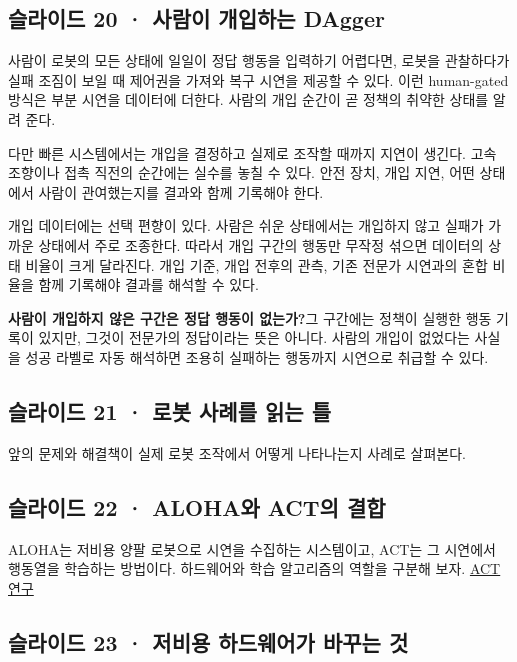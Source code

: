 \documentclass[11pt,a4paper]{article}
\begin{document}
\subsection{슬라이드 20 · 사람이 개입하는 DAgger}

사람이 로봇의 모든 상태에 일일이 정답 행동을 입력하기 어렵다면, 로봇을 관찰하다가 실패 조짐이 보일 때 제어권을 가져와 복구 시연을 제공할 수 있다. 이런 human-gated 방식은 부분 시연을 데이터에 더한다. 사람의 개입 순간이 곧 정책의 취약한 상태를 알려 준다.\par

다만 빠른 시스템에서는 개입을 결정하고 실제로 조작할 때까지 지연이 생긴다. 고속 조향이나 접촉 직전의 순간에는 실수를 놓칠 수 있다. 안전 장치, 개입 지연, 어떤 상태에서 사람이 관여했는지를 결과와 함께 기록해야 한다.\par

개입 데이터에는 선택 편향이 있다. 사람은 쉬운 상태에서는 개입하지 않고 실패가 가까운 상태에서 주로 조종한다. 따라서 개입 구간의 행동만 무작정 섞으면 데이터의 상태 비율이 크게 달라진다. 개입 기준, 개입 전후의 관측, 기존 전문가 시연과의 혼합 비율을 함께 기록해야 결과를 해석할 수 있다.\par

\par\medskip\noindent\textbf{사람이 개입하지 않은 구간은 정답 행동이 없는가?}\quad 그 구간에는 정책이 실행한 행동 기록이 있지만, 그것이 전문가의 정답이라는 뜻은 아니다. 사람의 개입이 없었다는 사실을 성공 라벨로 자동 해석하면 조용히 실패하는 행동까지 시연으로 취급할 수 있다.\par

\subsection{슬라이드 21 · 로봇 사례를 읽는 틀}

앞의 문제와 해결책이 실제 로봇 조작에서 어떻게 나타나는지 사례로 살펴본다.\par

\subsection{슬라이드 22 · ALOHA와 ACT의 결합}

ALOHA는 저비용 양팔 로봇으로 시연을 수집하는 시스템이고, ACT는 그 시연에서 행동열을 학습하는 방법이다. 하드웨어와 학습 알고리즘의 역할을 구분해 보자. \href{https://arxiv.org/abs/2304.13705}{ACT 연구}\par

\subsection{슬라이드 23 · 저비용 하드웨어가 바꾸는 것}
\end{document}
